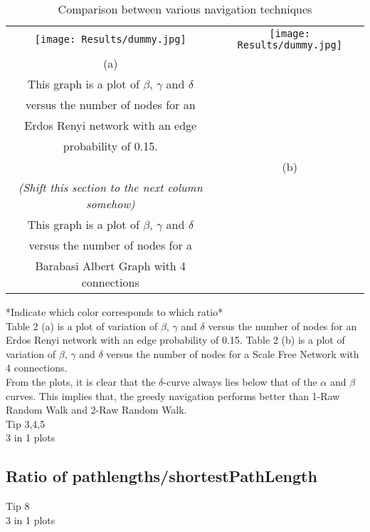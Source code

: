 \documentclass{article}
\begin{document}
\begin{table}[ht]
\centering
\caption{Comparison between various navigation techniques}
\begin{tabular}{cc}
\texttt{[image: Results/dummy.jpg]}
&
\texttt{[image: Results/dummy.jpg]}\\

(a)\\
This graph is a plot of $\beta$, $\gamma$ and $\delta$\\
versus the number of nodes for an\\
Erdos Renyi network with an edge\\
probability of 0.15.\\
&
(b)\\
\textit{(Shift this section to the next column somehow)}\\
This graph is a plot of $\beta$, $\gamma$ and $\delta$\\
versus the number of nodes for a\\
Barabasi Albert Graph with 4 connections\\

\end{tabular}
\label{tab:gt}
\end{table}

*Indicate which color corresponds to which ratio*\\

Table 2 (a) is a plot of variation of $\beta$, $\gamma$ and $\delta$ versus the number of nodes for an Erdos Renyi network with an edge probability of 0.15. Table 2 (b) is a plot of variation of $\beta$, $\gamma$ and $\delta$ versus the number of nodes for a Scale Free Network with 4 connections.\\

From the plots, it is clear that the $\delta$-curve always lies below that of the $\alpha$ and $\beta$ curves. This implies that, the greedy navigation performs better than 1-Raw Random Walk and 2-Raw Random Walk.\\

Tip 3,4,5\\
3 in 1 plots

\newpage

\subsection{Ratio of pathlengths/shortestPathLength}

Tip 8\\
3 in 1 plots
\end{document}
